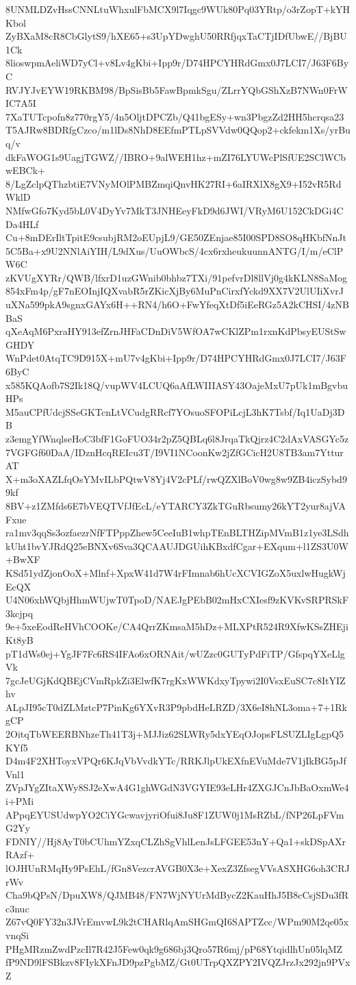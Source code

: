 8UNMLDZvHssCNNLtuWhxulFbMCX9l7Iqgc9WUk80Pq03YRtp/o3rZopT+kYHKbol
ZyBXaM8cR8CbGlytS9/hXE65+s3UpYDwghU50RRfjqxTaCTjIDfUbwE//BjBU1Ck
8lioswpmAeliWD7yCl+v8Lv4gKbi+Ipp9r/D74HPCYHRdGmx0J7LCI7/J63F6ByC
RVJYJvEYW19RKBM98/BpSisBb5FawBpmkSgu/ZLrrYQbGShXzB7NWn0FrWIC7A5I
7XaTUTcpofn8z770rgY5/4n5OljtDPCZb/Q41bgESy+wn3PbgzZd2HH5hcrqsa23
T5AJRw8BDRfgCzco/m1lDs8NhD8EEfmPTLpSVVdw0QQop2+ckfekm1Xs/yrBuq/v
dkFaWOG1s9UagjTGWZ//IBRO+9alWEH1hz+mZI76LYUWcPlSfUE2SClWCbwEBCk+
8/LgZclpQThzbtiE7VNyMOlPMBZmqiQnvHK27RI+6aIRXlX8gX9+I52vR5RdWklD
NMfwGfo7Kyd5bL0V4DyYv7MkT3JNHEeyFkD9d6JWI/VRyM6U152CkDGi4CDa4HLf
Cu+8mDErIltTpitE9csubjRM2oEUpjL9/GE50ZEnjae85I00SPD8SO8qHKbfNnJt
5C5Ba+x9U2NNlAiYIH/L9dXus/UuOWbcS/4cx6rxheukuunnANTG/I/m/eClPW6C
zKVUgXYRr/QWB/lfxrD1uzGWnib0bhbz7TXi/91pefvrDl8llVj0g4kKLN8SaMog
854xFm4p/gF7nEOInjIQXvabR5rZKicXjBy6MuPnCirxfYckd9XX7V2UlUIiXvrJ
uXNa599pkA9sgnxGAYx6H++RN4/h6O+FwYfeqXtDf5iEeRGz5A2kCHSI/4zNBBaS
qXeAqM6PxraHY913efZrnJHFaCDnDiV5WfOA7wCKlZPm1rxnKdPbsyEUStSwGHDY
WnPdet0AtqTC9D915X+mU7v4gKbi+Ipp9r/D74HPCYHRdGmx0J7LCI7/J63F6ByC
x585KQAofb7S2Ik18Q/vupWV4LCUQ6aAfLWIIIASY43OajeMxU7pUk1mBgvbuHPs
M5auCPfUdcjSSeGKTcnLtVCudgRRcf7YOsuoSFOPiLcjL3hK7Tsbf/Iq1UaDj3DB
z3emgYfWnqlseHoC3bfF1GoFUO34r2pZ5QBLq6l8JrqaTkQjrz4C2dAxVASGYc5z
7VGFGf60DaA/IDznHcqREIcu3T/I9VI1NCoonKw2jZfGCicH2U8TB3am7YtturAT
X+m3oXAZLfqOsYMvILbPQtwV8Yj4V2cPLf/rwQZXlBoV0wg8w9ZB4iczSybd99kf
8BV+z1ZMfds6E7bVEQTVfJfEcL/eYTARCY3ZkTGuRbsumy26kYT2yur8ajVAFxue
ra1mv3qqSs3ozfaezrNfFTPppZhew5CeeIuB1whpTEnBLTHZipMVmB1z1ye3LSdh
kUht1bvYJRdQ25eBNXv6Sva3QCAAUJDGUihKBxdfCgar+EXqum+l1ZS3U0W+BwXF
KSd51ydZjonOoX+Mlnf+XpxW41d7W4rFImnab6hUcXCVIGZoX5uxlwHugkWjEcQX
U4N06xhWQbjHhmWUjwT0TpoD/NAEJgPEbB02mHxCXIesf9zKVKvSRPRSkF3kcjpq
9e+5xeEodReHVhCOOKe/CA4QrrZKmsaM5hDz+MLXPtR524R9XfwKSsZHEjiKt8yB
pT1dWs0ej+YgJF7Fc6RS4IFAo6xORNAit/wUZzc0GUTyPdFiTP/GfspqYXeLlgVk
7gcJeUGjKdQBEjCVmRpkZi3ElwfK7rgKxWWKdxyTpywi2I0VsxEuSC7c8ItYIZhv
ALpJI95cT0dZLMztcP7PinKg6YXvR3P9pbdHeLRZD/3X6eI8hNL3oma+7+1RkgCP
2OitqTbWEERBNhzeTh41T3j+MJJiz62SLWRy5dxYEqOJopsFLSUZLIgLgpQ5KYf5
D4m4F2XHToyxVPQr6KJqVbVvdkYTc/RRKJlpUkEXfnEVuMde7V1jIkBG5pJfVnl1
ZVpJYgZItaXWy8SJ2eXwA4G1ghWGdN3VGYIE93eLHr4ZXGJCnJbBaOxmWe4i+PMi
APpqEYUSUdwpYO2CiYGcwavjyriOfui8Ju8F1ZUW0j1MsRZbL/fNP26LpFVmG2Yy
FDNIY//Hj8AyT0bCUhmYZxqCLZhSgVhlLenJsLFGEE53nY+Qa1+skDSpAXrRAzf+
lOJHUnRMqHy9PsEhL/fGn8VezcrAVGB0X3e+XexZ3ZfsegVVsASXHG6oh3CRJrWv
Cha9bQPsN/DpuXW8/QJMB48/FN7WjNYUrMdBycZ2KauHhJ5B8cCsjSDu3fRc3nuc
Z67vQ0FY32n3JVrEmvwL9k2tCHARlqAmSHGmQI6SAPTZcc/WPm90M2qe05xvnqSi
PHgMRzmZwdPzcIl7R42J5Few0qk9g686bj3Qro57R6mj/pP68YtqidlhUn05lqMZ
fP9ND9lFSBkzv8FIykXFnJD9pzPgbMZ/Gt0UTrpQXZPY2IVQZJrzJx292jn9PVxZ
